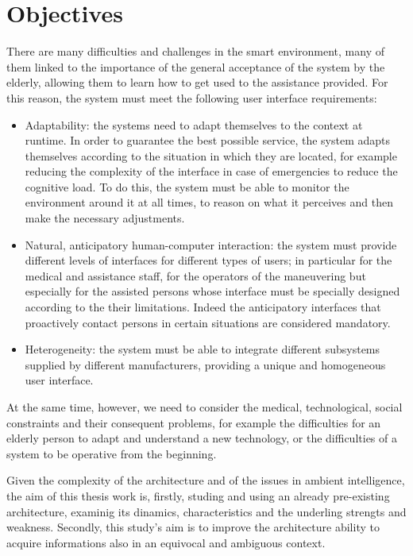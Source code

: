 \documentclass{thesisreport}
\begin{document}
 \section{Objectives}
 There are many difficulties and challenges in the smart environment, many of them linked to the importance of the general acceptance of the system by the elderly, allowing them to learn how to get used to the assistance provided. For this reason, the system must meet the following user interface requirements:
 \begin{itemize}
     \item Adaptability:  the systems need to adapt themselves to the context at runtime.
     In order to guarantee the best possible service, the system adapts themselves according to the situation in which they are located, for example reducing the complexity of the interface in case of emergencies to reduce the cognitive load.
     To do this, the system must be able to monitor the environment around it at all times, to reason on what it perceives and then make the necessary adjustments.
     \item  Natural, anticipatory human-computer interaction: the system must provide different levels of interfaces for different types of users; in particular for the medical and assistance staff, for the operators of the maneuvering but especially for the assisted persons whose interface must be specially designed according to the their limitations. 
     Indeed the anticipatory interfaces that proactively contact persons in certain situations are considered mandatory.
     \item Heterogeneity: the system must be able to integrate different subsystems supplied by different manufacturers, providing a unique and homogeneous user interface.
 \end{itemize}
 At the same time, however, we need to consider the medical, technological, social constraints and their consequent problems, for example the difficulties for an elderly person to adapt and understand a new technology, or the difficulties of a system to be operative from the beginning.
 
 Given the complexity of the architecture and of the issues in ambient intelligence, the aim of this thesis work is, firstly, studing and using an already pre-existing architecture, examinig its dinamics, characteristics and the underling strengts and weakness. Secondly, this study’s aim is to improve the architecture ability to acquire informations also in an equivocal and ambiguous context.
 
\end{document}
